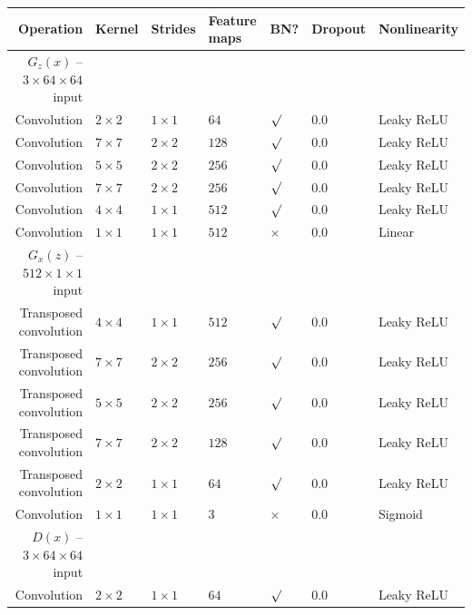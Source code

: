 \documentclass{article}
\begin{document}
{\begin{table}[h]
\centering
\begin{tabular}{@{}rllllll@{}} \toprule
Operation              & Kernel       & Strides      & Feature maps & BN?          & Dropout & Nonlinearity \\ \midrule
$G_z(x)$ -- $3 \times 64 \times 64$ input                                                                 \\
Convolution            & $2 \times 2$ & $1 \times 1$ & $64$         & $\surd$      & 0.0     & Leaky ReLU \\
Convolution            & $7 \times 7$ & $2 \times 2$ & $128$        & $\surd$      & 0.0     & Leaky ReLU \\
Convolution            & $5 \times 5$ & $2 \times 2$ & $256$        & $\surd$      & 0.0     & Leaky ReLU \\
Convolution            & $7 \times 7$ & $2 \times 2$ & $256$        & $\surd$      & 0.0     & Leaky ReLU \\
Convolution            & $4 \times 4$ & $1 \times 1$ & $512$        & $\surd$      & 0.0     & Leaky ReLU \\
Convolution            & $1 \times 1$ & $1 \times 1$ & $512$        & $\times$     & 0.0     & Linear     \\
$G_x(z)$ -- $512 \times 1 \times 1$ input                                                                 \\
Transposed convolution & $4 \times 4$ & $1 \times 1$ & $512$        & $\surd$      & 0.0     & Leaky ReLU \\
Transposed convolution & $7 \times 7$ & $2 \times 2$ & $256$        & $\surd$      & 0.0     & Leaky ReLU \\
Transposed convolution & $5 \times 5$ & $2 \times 2$ & $256$         & $\surd$      & 0.0     & Leaky ReLU \\
Transposed convolution & $7 \times 7$ & $2 \times 2$ & $128$         & $\surd$      & 0.0     & Leaky ReLU \\
Transposed convolution & $2 \times 2$ & $1 \times 1$ & $64$         & $\surd$      & 0.0     & Leaky ReLU \\
Convolution            & $1 \times 1$ & $1 \times 1$ & $3$          & $\times$     & 0.0     & Sigmoid    \\
$D(x)$ -- $3 \times 64 \times 64$ input                                                                   \\
Convolution            & $2 \times 2$ & $1 \times 1$ & $64$         & $\surd$      & 0.0     & Leaky ReLU \\

\end{tabular}
\end{table}}
\end{document}
